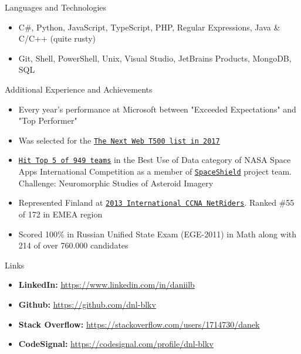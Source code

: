 \documentclass[calibri]{mcdowellcv}
\newcommand{\ultthref}[2]{\href{#1}{\underline{\texttt{#2}}}}
\newcommand{\ulurl}[1]{\underline{\url{#1}}}
\begin{document}
	\begin{cvsection}{Languages and Technologies}	
	\begin{cvsubsection}{}{}{}
		\begin{itemize}
			\item C\#, Python, JavaScript, TypeScript, PHP, Regular Expressions, Java \& C/C++ (quite rusty)
			\item Git, Shell, PowerShell, Unix, Visual Studio, JetBrains Products, MongoDB, SQL
		\end{itemize}
	\end{cvsubsection}
	\end{cvsection}
	
	\begin{cvsection}{Additional Experience and Achievements}		
		\begin{cvsubsection}{}{}{}
			\begin{itemize}
				\item Every year's performance at Microsoft between "Exceeded Expectations" and "Top Performer"
				\item Was selected for the \ultthref{https://thenextweb.com/conference/t500}{The Next Web T500 list in 2017}
				\item \ultthref{https://open.nasa.gov/blog/space-apps-2015-finalists-announced/}{Hit Top 5 of 949 teams} in the Best Use of Data category of NASA Space Apps International Competition as a member of \ultthref{https://2015.spaceappschallenge.org/project/spaceshield/}{SpaceShield} project team. Challenge: Neuromorphic Studies of Asteroid Imagery
				\item Represented Finland at \ultthref{http://www.academynetriders.com/file.php/1/netriders_info/pdfs/Results_2013_NetRiders_EMEA_International_CCNA.pdf}{2013 International CCNA NetRiders}. Ranked \#55 of 172 in EMEA region
				\item Scored 100\% in Russian Unified State Exam (EGE-2011) in Math along with 214 of over 760.000 candidates
			\end{itemize}
		\end{cvsubsection}
	\end{cvsection}

	\begin{cvsection}{Links}
		\begin{cvsubsection}{}{}{}
			\begin{itemize}
                                       \item \textbf{LinkedIn:} \ulurl{https://www.linkedin.com/in/daniilb}
				\item \textbf{Github:} \ulurl{https://github.com/dnl-blkv}
				\item \textbf{Stack Overflow:} \ulurl{https://stackoverflow.com/users/1714730/danek}
				\item \textbf{CodeSignal:} \ulurl{https://codesignal.com/profile/dnl-blkv}
			\end{itemize}
		\end{cvsubsection}
	\end{cvsection}
\end{document}
